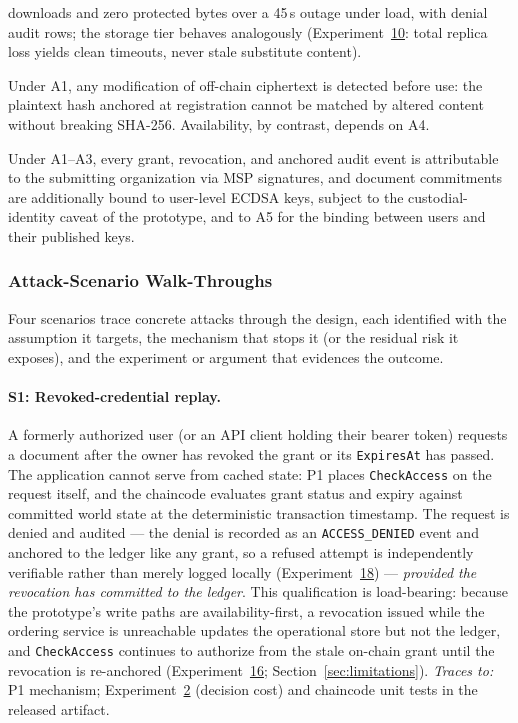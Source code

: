 \documentclass[preprint,12pt]{elsarticle}
\begin{document}
\begin{description}
downloads and zero protected bytes over a 45\,s outage under load,
with denial audit rows; the storage tier behaves analogously
(Experiment~\hyperref[sec:exp_ipfscost]{10}: total replica loss
yields clean timeouts, never stale substitute content).
\item[P3 (Tamper evidence for stored content).] Under A1, any
modification of off-chain ciphertext is detected before use: the
plaintext hash anchored at registration cannot be matched by altered
content without breaking SHA-256. Availability, by contrast, depends
on A4.
\item[P4 (Attributable ledger actions).] Under A1--A3, every grant,
revocation, and anchored audit event is attributable to the
submitting organization via MSP signatures, and document commitments
are additionally bound to user-level ECDSA keys, subject to the
custodial-identity caveat of the prototype, and to A5 for the
binding between users and their published keys.
\end{description}

\subsubsection{Attack-Scenario Walk-Throughs}
\label{sec:attack_scenarios}

Four scenarios trace concrete attacks through the design, each
identified with the assumption it targets, the mechanism that stops it
(or the residual risk it exposes), and the experiment or argument that
evidences the outcome.

\paragraph{S1: Revoked-credential replay.} A formerly authorized user
(or an API client holding their bearer token) requests a document
after the owner has revoked the grant or its \texttt{ExpiresAt} has
passed. The application cannot serve from cached state: P1 places
\texttt{CheckAccess} on the request itself, and the chaincode
evaluates grant status and expiry against committed world state at
the deterministic transaction timestamp. The request is denied and
audited --- the denial is recorded as an \texttt{ACCESS\_DENIED} event and
anchored to the ledger like any grant, so a refused attempt is
independently verifiable rather than merely logged locally
(Experiment~\hyperref[sec:exp_db_mutation]{18}) --- \emph{provided the
revocation has committed to the ledger}.
This qualification is load-bearing: because the prototype's write paths
are availability-first, a revocation issued while the ordering service is
unreachable updates the operational store but not the ledger, and
\texttt{CheckAccess} continues to authorize from the stale on-chain grant
until the revocation is re-anchored
(Experiment~\hyperref[sec:exp_orderer_outage]{16};
Section~\ref{sec:limitations}). \emph{Traces to:} P1 mechanism;
Experiment~\hyperref[sec:exp_latency]{2} (decision cost) and chaincode
unit tests in the released artifact.
\end{document}
